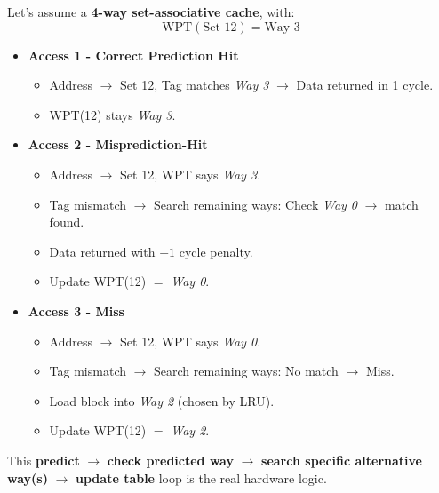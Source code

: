\begin{itemize}
\begin{itemize}
\begin{examplebox}
            Let's assume a \textbf{4-way set-associative cache}, with:
            \begin{equation*}
                \text{WPT}\left(\text{Set } 12\right) = \text{Way } 3
            \end{equation*}
            \begin{itemize}
                \item \textbf{Access 1 - Correct Prediction Hit}
                \begin{itemize}
                    \item Address $\rightarrow$ Set 12, Tag matches \emph{Way 3} $\rightarrow$ Data returned in 1 cycle.
                    \item WPT(12) stays \emph{Way 3}.
                \end{itemize}
                \item \textbf{Access 2 - Misprediction-Hit}
                \begin{itemize}
                    \item Address $\rightarrow$ Set 12, WPT says \emph{Way 3}.
                    \item Tag mismatch $\rightarrow$ Search remaining ways: Check \emph{Way 0} $\rightarrow$ match found.
                    \item Data returned with $+1$ cycle penalty.
                    \item Update WPT(12) $=$ \emph{Way 0}.
                \end{itemize}
                \newpage
                \item \textbf{Access 3 - Miss}
                \begin{itemize}
                    \item Address $\rightarrow$ Set 12, WPT says \emph{Way 0}.
                    \item Tag mismatch $\rightarrow$ Search remaining ways: No match $\rightarrow$ Miss.
                    \item Load block into \emph{Way 2} (chosen by LRU).
                    \item Update WPT(12) $=$ \emph{Way 2}.
                \end{itemize}
            \end{itemize}
            This \textbf{predict} $\rightarrow$ \textbf{check predicted way} $\rightarrow$ \textbf{search specific alternative way(s)} $\rightarrow$ \textbf{update table} loop is the real hardware logic.
        \end{examplebox}

\end{itemize}
\end{itemize}

